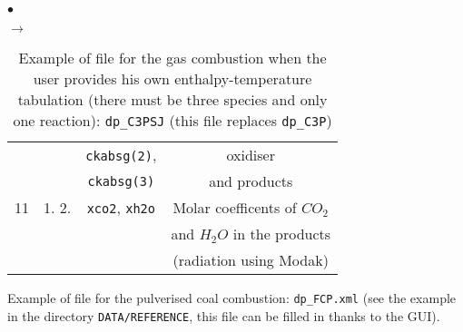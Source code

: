 {{\begin{list}{$\bullet$}{}
\begin{list}{$\rightarrow$}{}
\begin{table}[htbp]
\begin{center}
{\begin{tabular}{|c|c|c|c|}
        &                                   &                  \texttt{ckabsg(2)}, & oxidiser                                    \\
        &                                   &                  \texttt{ckabsg(3)}  & and products                                \\ \hline
  11    &    1.       2.                    & \texttt{xco2\index{xco2}},   \texttt{xh2o\index{xh2o}}& Molar coefficents of $CO_2$         \\
        &                                   &                             & and $H_2O$ in the products                  \\
        &                                   &                             & (radiation using Modak)                     \\ \hline
\end{tabular}
}
\caption{Example of file for the gas combustion when the user provides
 his own enthalpy-temperature tabulation
                     (there must be three species and only one
                     reaction): \texttt{dp\_C3PSJ} (this file replaces
 \texttt{dp\_C3P})}\label{tab_dpC3PSJ}
\end{center}
\end{table}
        \end{list}

       \item Example of file for the pulverised coal combustion:
             \texttt{dp\_FCP.xml} (see the example in the directory \texttt{DATA/REFERENCE}, 
             this file can be filled in thanks to the GUI).


\end{list}}}
